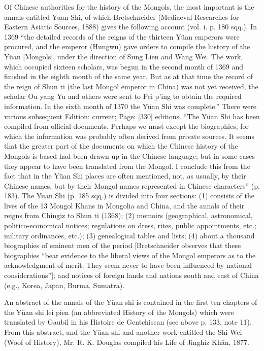 {}Of Chinese authorities for the history of the Mongols, the most important is the annals entitled Yuan Shi, of which Bretschneider (Mediaeval Researches for Eastern Asiatic Sources, 1888) gives the following account (vol. i. p. 180 sqq.). In 1369 \texthebrew{“}the detailed records of the reigns of the thirteen Yüan emperors were procured, and the emperor (Hungwu) gave orders to compile the history of the Yüan [Mongols], under the direction of Sung Lien and Wang Wei. The work, which occupied sixteen scholars, was begun in the second month of 1369 and finished in the eighth month of the same year. But as at that time the record of the reign of Shun ti (the last Mongol emperor in China) was not yet received, the scholar Ou yang Yu and others were sent to Pei p\texthebrew{}’ing to obtain the required information. In the sixth month of 1370 the Yüan Shi was complete.\texthebrew{}” There were various subsequent Edition: current; Page: [330] editions. \texthebrew{“}The Yüan Shi has been compiled from official documents. Perhaps we must except the biographies, for which the information was probably often derived from private sources. It seems that the greater part of the documents on which the Chinese history of the Mongols is based had been drawn up in the Chinese language; but in some cases they appear to have been translated from the Mongol. I conclude this from the fact that in the Yüan Shi places are often mentioned, not, as usually, by their Chinese names, but by their Mongol names represented in Chinese characters\texthebrew{}” (p. 183). The Yuan Shi (p. 185 sqq.) is divided into four sections: (1) consists of the lives of the 13 Mongol Khans in Mongolia and China, and the annals of their reigns from Chingiz to Shun ti (1368); (2) memoirs (geographical, astronomical, politico-economical notices; regulations on dress, rites, public appointments, etc.; military ordinances, etc.); (3) genealogical tables and lists; (4) about a thousand biographies of eminent men of the period [Bretschneider observes that these biographies \texthebrew{“}bear evidence to the liberal views of the Mongol emperors as to the acknowledgment of merit. They seem never to have been influenced by national considerations\texthebrew{}”]; and notices of foreign lands and nations south and east of China (e.g., Korea, Japan, Burma, Sumatra).

An abstract of the annals of the Yüan shi is contained in the first ten chapters of the Yüan shi lei pien (an abbreviated History of the Mongols) which were translated by Gaubil in his Histoire de Gentchiscan (see above p. 133, note 11). From this abstract, and the Yüan shi and another work entitled the Shi Wei (Woof of History), Mr. R. K. Douglas compiled his Life of Jinghiz Khān, 1877.

